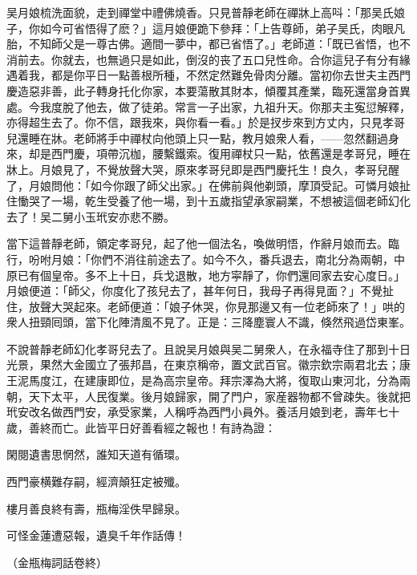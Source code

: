 吴月娘梳洗面貌，走到禪堂中禮佛燒香。只見普靜老師在禪牀上高呌：「那吴氏娘子，你如今可省悟得了麽？」這月娘便跪下參拜：「上告尊師，弟子吴氏，肉眼凡胎，不知師父是一尊古佛。適間一夢中，都已省悟了。」老師道：「既已省悟，也不消前去。你就去，也無過只是如此，倒沒的丧了五口兒性命。合你這兒子有分有緣遇着我，都是你平日一點善根所種，不然定然難免骨肉分離。當初你去世夫主西門慶造惡非善，此子轉身托化你家，本要蕩散其財本，傾覆其產業，臨死還當身首異處。今我度脫了他去，做了徒弟。常言一子出家，九祖升天。你那夫主寃愆解釋，亦得超生去了。你不信，跟我來，與你看一看。」於是扠步來到方丈内，只見孝哥兒還睡在牀。老師將手中禪杖向他頭上只一點，教月娘衆人看，——忽然翻過身來，却是西門慶，項帶沉枷，腰繫鐵索。復用禪杖只一點，依舊還是孝哥兒，睡在牀上。月娘見了，不覺放聲大哭，原來孝哥兒即是西門慶托生！良久，孝哥兒醒了，月娘問他：「如今你跟了師父出家。」在佛前與他剃頭，摩頂受記。可憐月娘扯住慟哭了一場，乾生受養了他一場，到十五歲指望承家嗣業，不想被這個老師幻化去了！吴二舅小玉玳安亦悲不勝。

當下這普靜老師，領定孝哥兒，起了他一個法名，喚做明悟，作辭月娘而去。臨行，吩咐月娘：「你們不消往前途去了。如今不久，番兵退去，南北分為兩朝，中原已有個皇帝。多不上十日，兵戈退散，地方寜靜了，你們還囘家去安心度日。」月娘便道：「師父，你度化了孩兒去了，甚年何日，我母子再得見面？」不覺扯住，放聲大哭起來。老師便道：「娘子休哭，你見那邊又有一位老師來了！」哄的衆人扭頸囘頭，當下化陣清風不見了。正是：三降塵寰人不識，倏然飛過岱東峯。

不說普靜老師幻化孝哥兒去了。且說吴月娘與吴二舅衆人，在永福寺住了那到十日光景，果然大金國立了張邦昌，在東京稱帝，置文武百官。徽宗欽宗兩君北去；康王泥馬度江，在建康即位，是為高宗皇帝。拜宗澤為大將，復取山東河北，分為兩朝，天下太平，人民復業。後月娘歸家，開了門户，家産器物都不曾疎失。後就把玳安改名做西門安，承受家業，人稱呼為西門小員外。養活月娘到老，壽年七十歲，善終而亡。此皆平日好善看經之報也！有詩為證：

\begin{myquote}
閑閱遺書思惘然，誰知天道有循環。

西門豪横難存嗣，經濟顛狂定被殲。

樓月善良終有壽，瓶梅淫佚早歸泉。

可怪金蓮遭惡報，遺臭千年作話傳！
\end{myquote}

\begin{myquote}
{\kaishu\small\color{gray}（金瓶梅詞話卷終）}
\end{myquote}

\theendnotes


